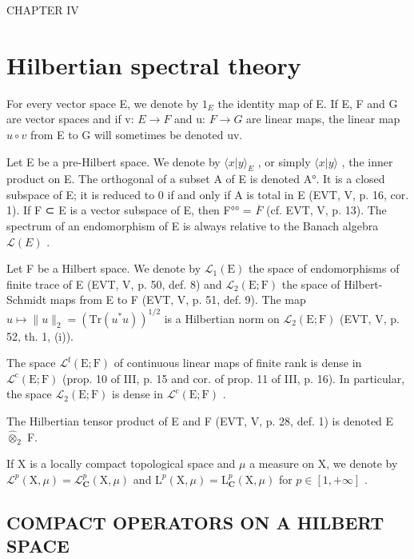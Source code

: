 CHAPTER IV

\chapter{Hilbertian spectral theory}
\setcounter{exercisepar}{0}

For every vector space E, we denote by \(1_{E}\) the identity map of E. If E, F and G are vector spaces and if v: \(E \rightarrow F\) and u: \(F \rightarrow G\) are linear maps, the linear map \(u \circ v\) from E to G will sometimes be denoted uv.

Let E be a pre-Hilbert space. We denote by \(\langle x|y\rangle_{E}\) , or simply \(\langle x|y\rangle\) , the inner product on E. The orthogonal of a subset A of E is denoted A°. It is a closed subspace of E; it is reduced to 0 if and only if A is total in E (EVT, V, p. 16, cor. 1). If F ⊂ E is a vector subspace of E, then F°° = \(\overline{F}\) (cf. EVT, V, p. 13). The spectrum of an endomorphism of E is always relative to the Banach algebra \(\mathcal{L}(E)\) .

Let F be a Hilbert space. We denote by \(\mathcal{L}_1(\mathrm{E})\) the space of endomorphisms of finite trace of E (EVT, V, p. 50, def. 8) and \(\mathcal{L}_2(\mathrm{E};\mathrm{F})\) the space of Hilbert-Schmidt maps from E to F (EVT, V, p. 51, def. 9). The map \(u\mapsto \| u\| _2 = (\mathrm{Tr}(u^{*}u))^{1 / 2}\) is a Hilbertian norm on \(\mathcal{L}_2(\mathrm{E};\mathrm{F})\) (EVT, V, p. 52, th. 1, (i)).

The space \(\mathcal{L}^{\mathrm{f}}(\mathrm{E};\mathrm{F})\) of continuous linear maps of finite rank is dense in \(\mathcal{L}^{\mathrm{c}}(\mathrm{E};\mathrm{F})\) (prop. 10 of III, p. 15 and cor. of prop. 11 of III, p. 16). In particular, the space \(\mathcal{L}_2(\mathrm{E};\mathrm{F})\) is dense in \(\mathcal{L}^{\mathrm{c}}(\mathrm{E};\mathrm{F})\) .

The Hilbertian tensor product of E and F (EVT, V, p. 28, def. 1) is denoted E \(\widehat{\otimes}_2\) F.

If X is a locally compact topological space and \(\mu\) a measure on X, we denote by \(\mathcal{L}^{p}(\mathrm{X},\mu)=\mathcal{L}_{\mathbf{C}}^{p}(\mathrm{X},\mu)\) and \(\mathrm{L}^{p}(\mathrm{X},\mu)=\mathrm{L}_{\mathbf{C}}^{p}(\mathrm{X},\mu)\) for \(p\in[1,+\infty]\) .

\section{COMPACT OPERATORS ON A HILBERT SPACE}

